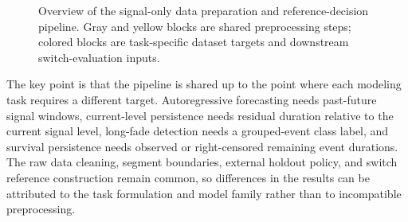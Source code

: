 \begin{figure}[p]
{%
}

\caption{Overview of the signal-only data preparation and reference-decision
pipeline. Gray and yellow blocks are shared preprocessing steps; colored
blocks are task-specific dataset targets and downstream switch-evaluation
inputs.}

\label{fig:data-preparation-pipeline}
\end{figure}


The key point is that the pipeline is shared up to the point where each
modeling task requires a different target. Autoregressive forecasting needs
past-future signal windows, current-level persistence needs residual duration
relative to the current signal level, long-fade detection needs a grouped-event
class label, and survival persistence needs observed or right-censored
remaining event durations. The raw data cleaning, segment boundaries, external
holdout policy, and switch reference construction remain common, so differences
in the results can be attributed to the task formulation and model family
rather than to incompatible preprocessing.

